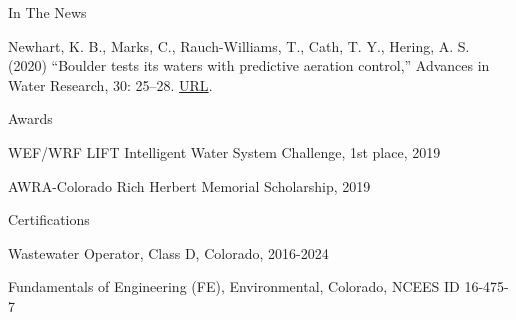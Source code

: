 \documentclass{resume} %
\begin{document}
\begin{rSection}{In The News}

Newhart, K. B., Marks, C., Rauch-Williams, T., Cath, T. Y., Hering, A. S. (2020) “Boulder tests its waters with predictive aeration control,” Advances in Water Research, 30: 25–28. \href{https://www.advancesinwaterresearch.org/awr/20200709/MobilePagedArticle.action?articleId=1621836&pm=1#articleId1621836}{URL}.
\end{rSection}


\begin{rSection}{Awards}

WEF/WRF LIFT Intelligent Water System Challenge, 1st place, 2019

AWRA-Colorado Rich Herbert Memorial Scholarship, 2019

\end{rSection}


\begin{rSection}{Certifications}

Wastewater Operator, Class D, Colorado, 2016-2024

Fundamentals of Engineering (FE), Environmental, Colorado, NCEES ID 16-475-7
\end{rSection}
\end{document}
